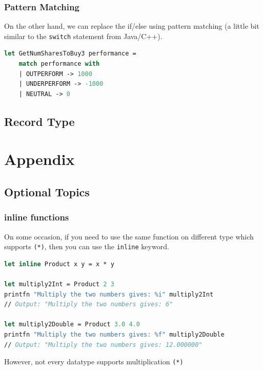\documentclass[12pt]{article}
\begin{document}
\subsubsection*{Pattern Matching}
On the other hand, we can replace the if/else using pattern matching (a little bit similar to the \texttt{switch} statement from Java/C++).
\begin{lstlisting}[language=FSharp]
let GetNumSharesToBuy3 performance =
    match performance with
    | OUTPERFORM -> 1000
    | UNDERPERFORM -> -1000
    | NEUTRAL -> 0
\end{lstlisting}
\subsection{Record Type}

































\pagebreak

\appendix
\section{Appendix}

\subsection{Optional Topics}
\subsubsection{inline functions}
On some occasion, if you need to use the same function on different type which supports \texttt{(*)}, then you can use the \texttt{inline} keyword.
\begin{lstlisting}[language=FSharp]
let inline Product x y = x * y

let multiply2Int = Product 2 3
printfn "Multiply the two numbers gives: %i" multiply2Int
// Output: "Multiply the two numbers gives: 6"

let multiply2Double = Product 3.0 4.0
printfn "Multiply the two numbers gives: %f" multiply2Double
// Output: "Multiply the two numbers gives: 12.000000"
\end{lstlisting}
However, not every datatype supports multiplication \texttt{(*)}
\end{document}
